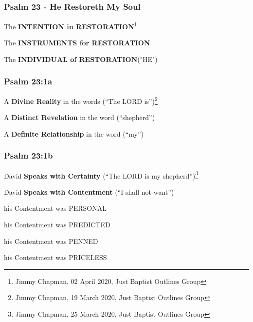 \subsubsection{Psalm 23 - He Restoreth My Soul}
\begin{compactenum}[I.]
    \item The \textbf{INTENTION in RESTORATION}\footnote{Jimmy Chapman, 02 April 2020, Just Baptist Outlines Group}
    \item The \textbf{INSTRUMENTS for RESTORATION}
    \item The \textbf{INDIVIDUAL of RESTORATION}("HE")
\end{compactenum}

\subsubsection{Psalm 23:1a}
\begin{compactenum}[I.]
    \item A \textbf{Divine Reality} in the words (``The LORD is'')\footnote{Jimmy Chapman, 19 March 2020, Just Baptist Outlines Group}
    \item A \textbf{Distinct Revelation} in the word (``shepherd'')
    \item A \textbf{Definite Relationship} in the word (``my'')
\end{compactenum}

\subsubsection{Psalm 23:1b}
\begin{compactenum}[I.]
    \item David \textbf{Speaks with Certainty}  (``The LORD is my shepherd'')\footnote{Jimmy Chapman, 25 March 2020, Just Baptist Outlines Group}
    \item David \textbf{Speaks with Contentment}  (``I shall not want'')
    \begin{compactenum}[A.]
        \item his Contentment was PERSONAL
        \item his Contentment was PREDICTED
        \item his Contentment was PENNED
        \item his Contentment was PRICELESS
    \end{compactenum}
\end{compactenum}

